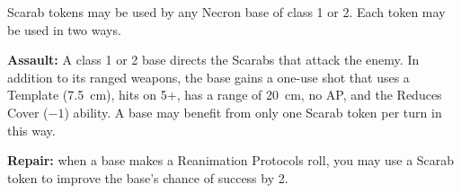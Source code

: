 Scarab tokens may be used by any Necron base of class 1 or 2. Each token may be used in two ways.

\textbf{Assault:} A class 1 or 2 base directs the Scarabs that attack the enemy. In addition to its ranged weapons, the base gains a one-use shot that uses a Template (7.5~cm), hits on 5+, has a range of 20~cm, no AP, and the Reduces Cover ($-1$) ability. A base may benefit from only one Scarab token per turn in this way.

\textbf{Repair:} when a base makes a Reanimation Protocols roll, you may use a Scarab token to improve the base's chance of success by 2.
